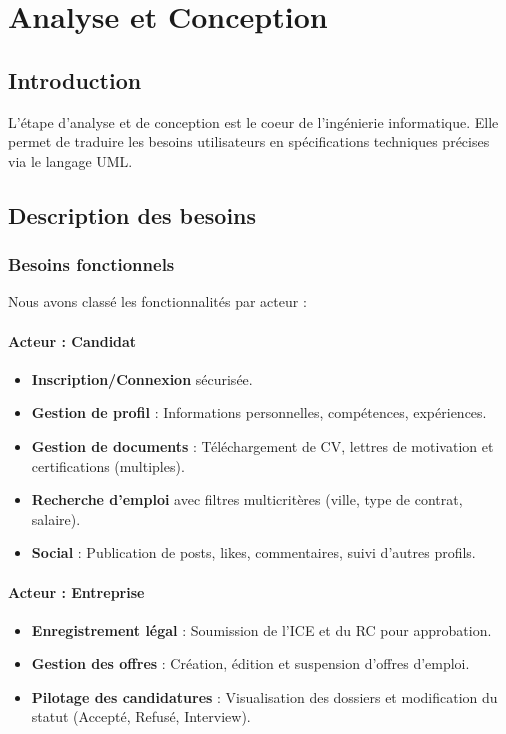 \documentclass[12pt,a4paper]{report}
\begin{document}
\chapter{Analyse et Conception}
\section{Introduction}
L'étape d'analyse et de conception est le coeur de l'ingénierie informatique. Elle permet de traduire les besoins utilisateurs en spécifications techniques précises via le langage UML.

\section{Description des besoins}
\subsection{Besoins fonctionnels}
Nous avons classé les fonctionnalités par acteur :
\subsubsection{Acteur : Candidat}
\begin{itemize}
    \item \textbf{Inscription/Connexion} sécurisée.
    \item \textbf{Gestion de profil} : Informations personnelles, compétences, expériences.
    \item \textbf{Gestion de documents} : Téléchargement de CV, lettres de motivation et certifications (multiples).
    \item \textbf{Recherche d'emploi} avec filtres multicritères (ville, type de contrat, salaire).
    \item \textbf{Social} : Publication de posts, likes, commentaires, suivi d'autres profils.
\end{itemize}
\subsubsection{Acteur : Entreprise}
\begin{itemize}
    \item \textbf{Enregistrement légal} : Soumission de l'ICE et du RC pour approbation.
    \item \textbf{Gestion des offres} : Création, édition et suspension d'offres d'emploi.
    \item \textbf{Pilotage des candidatures} : Visualisation des dossiers et modification du statut (Accepté, Refusé, Interview).
\end{itemize}
\end{document}
